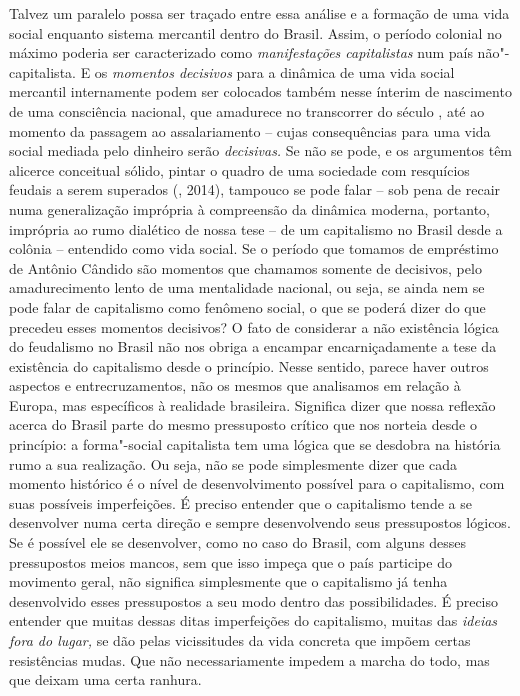 Talvez um paralelo possa ser traçado entre essa análise e a formação de
uma vida social enquanto sistema mercantil dentro do Brasil. Assim, o
período colonial no máximo poderia ser caracterizado como
\emph{manifestações capitalistas} num país não"-capitalista. E os
\emph{momentos decisivos} para a dinâmica de uma vida social mercantil
internamente podem ser colocados também nesse ínterim de nascimento de
uma consciência nacional, que amadurece no transcorrer do século ,
até ao momento da passagem ao assalariamento -- cujas consequências para
uma vida social mediada pelo dinheiro serão \emph{decisivas.} Se não se
pode, e os argumentos têm alicerce conceitual sólido, pintar o quadro de
uma sociedade com resquícios feudais a serem superados (, 2014),
tampouco se pode falar -- sob pena de recair numa generalização
imprópria à compreensão da dinâmica moderna, portanto, imprópria ao rumo
dialético de nossa tese -- de um capitalismo no Brasil desde a colônia
-- entendido como vida social. Se o período que tomamos de empréstimo de
Antônio Cândido são momentos que chamamos somente de decisivos, pelo
amadurecimento lento de uma mentalidade nacional, ou seja, se ainda nem
se pode falar de capitalismo como fenômeno social, o que se poderá dizer
do que precedeu esses momentos decisivos? O fato de considerar a não
existência lógica do feudalismo no Brasil não nos obriga a encampar
encarniçadamente a tese da existência do capitalismo desde o princípio.
Nesse sentido, parece haver outros aspectos e entrecruzamentos, não os
mesmos que analisamos em relação à Europa, mas específicos à realidade
brasileira. Significa dizer que nossa reflexão acerca do Brasil parte do
mesmo pressuposto crítico que nos norteia desde o princípio: a
forma"-social capitalista tem uma lógica que se desdobra na história rumo
a sua realização. Ou seja, não se pode simplesmente dizer que cada
momento histórico é o nível de desenvolvimento possível para o
capitalismo, com suas possíveis imperfeições. É preciso entender que o
capitalismo tende a se desenvolver numa certa direção e sempre
desenvolvendo seus pressupostos lógicos. Se é possível ele se
desenvolver, como no caso do Brasil, com alguns desses pressupostos
meios mancos, sem que isso impeça que o país participe do movimento
geral, não significa simplesmente que o capitalismo já tenha
desenvolvido esses pressupostos a seu modo dentro das possibilidades. É
preciso entender que muitas dessas ditas imperfeições do capitalismo,
muitas das \emph{ideias fora do lugar,} se dão pelas vicissitudes da
vida concreta que impõem certas resistências mudas. Que não
necessariamente impedem a marcha do todo, mas que deixam uma certa
ranhura.


